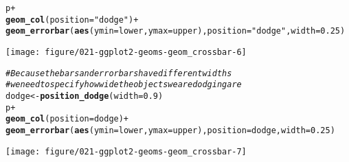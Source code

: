 \documentclass[a4paper,titlepage]{tufte-handout}\usepackage[]{graphicx}\usepackage[]{color}
\makeatletter
\def\maxwidth{ %
  \ifdim\Gin@nat@width>\linewidth
    \linewidth
  \else
    \Gin@nat@width
  \fi
}
\newcommand{\hlnum}[1]{\textcolor[rgb]{0.686,0.059,0.569}{#1}}%
\newcommand{\hlstr}[1]{\textcolor[rgb]{0.192,0.494,0.8}{#1}}%
\newcommand{\hlcom}[1]{\textcolor[rgb]{0.678,0.584,0.686}{\textit{#1}}}%
\newcommand{\hlopt}[1]{\textcolor[rgb]{0,0,0}{#1}}%
\newcommand{\hlstd}[1]{\textcolor[rgb]{0.345,0.345,0.345}{#1}}%
\newcommand{\hlkwb}[1]{\textcolor[rgb]{0.69,0.353,0.396}{#1}}%
\newcommand{\hlkwc}[1]{\textcolor[rgb]{0.333,0.667,0.333}{#1}}%
\newcommand{\hlkwd}[1]{\textcolor[rgb]{0.737,0.353,0.396}{\textbf{#1}}}%
\newenvironment{kframe}{%
 \def\at@end@of@kframe{}%
 \ifinner\ifhmode%
  \def\at@end@of@kframe{\end{minipage}}%
  \begin{minipage}{\columnwidth}%
 \fi\fi%
 \def\FrameCommand##1{\hskip\@totalleftmargin \hskip-\fboxsep
 \colorbox{shadecolor}{##1}\hskip-\fboxsep
     \hskip-\linewidth \hskip-\@totalleftmargin \hskip\columnwidth}%
 \MakeFramed {\advance\hsize-\width
   \@totalleftmargin\z@ \linewidth\hsize
   \@setminipage}}%
 {\par\unskip\endMakeFramed%
 \at@end@of@kframe}
\newenvironment{knitrout}{}{} %
\makeatother
\begin{document}
\begin{knitrout}
\begin{kframe}
\begin{alltt}
\hlstd{p} \hlopt{+}
 \hlkwd{geom_col}\hlstd{(}\hlkwc{position} \hlstd{=} \hlstr{"dodge"}\hlstd{)} \hlopt{+}
 \hlkwd{geom_errorbar}\hlstd{(}\hlkwd{aes}\hlstd{(}\hlkwc{ymin} \hlstd{= lower,} \hlkwc{ymax} \hlstd{= upper),} \hlkwc{position} \hlstd{=} \hlstr{"dodge"}\hlstd{,} \hlkwc{width} \hlstd{=} \hlnum{0.25}\hlstd{)}
\end{alltt}
\end{kframe}
\texttt{[image: figure/021-ggplot2-geoms-geom\_crossbar-6]} 
\begin{kframe}\begin{alltt}
\hlcom{# Because the bars and errorbars have different widths}
\hlcom{# we need to specify how wide the objects we are dodging are}
\hlstd{dodge} \hlkwb{<-} \hlkwd{position_dodge}\hlstd{(}\hlkwc{width}\hlstd{=}\hlnum{0.9}\hlstd{)}
\hlstd{p} \hlopt{+}
  \hlkwd{geom_col}\hlstd{(}\hlkwc{position} \hlstd{= dodge)} \hlopt{+}
  \hlkwd{geom_errorbar}\hlstd{(}\hlkwd{aes}\hlstd{(}\hlkwc{ymin} \hlstd{= lower,} \hlkwc{ymax} \hlstd{= upper),} \hlkwc{position} \hlstd{= dodge,} \hlkwc{width} \hlstd{=} \hlnum{0.25}\hlstd{)}
\end{alltt}
\end{kframe}
\texttt{[image: figure/021-ggplot2-geoms-geom\_crossbar-7]} 

\end{knitrout}
\end{document}
